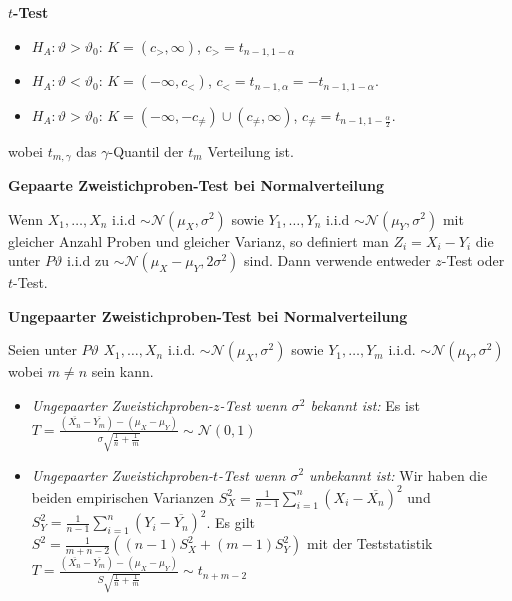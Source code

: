 \documentclass[25pt]{sciposter}
\newenvironment{method}[1]{\begin{mdframed}[backgroundcolor=blue!10,innertopmargin=15pt, innerbottommargin=15pt,nobreak=true]
		\textbf{#1 }
	}
	{ 
	\end{mdframed}
}
\begin{document}
\begin{multicols}{3}
\begin{method}{$t$-Test}
			\begin{itemize}
				\item $H_A: \vartheta > \vartheta_0$: $K = (c_>,\infty)$, $c_> = t_{n-1,1-\alpha}$
				\item $H_A: \vartheta < \vartheta_0$: $K = (-\infty,c_<)$, $c_< = t_{n-1,\alpha} = -t_{n-1,1-\alpha}$.
				\item $H_A: \vartheta > \vartheta_0$: $K = (-\infty,-c_{\neq}) \cup (c_{\neq},\infty)$, $c_{\neq} = t_{n-1,1-\frac{\alpha}{2}}$.
			\end{itemize}
			wobei $t_{m,\gamma}$ das $\gamma$-Quantil der $t_m$ Verteilung ist.
		\end{method}
		
		\begin{method}{Gepaarte Zweistichproben-Test bei Normalverteilung}
			Wenn $X_1,\ldots,X_n$ i.i.d $\sim \mathcal{N}(\mu_X,\sigma^2)$ sowie $Y_1,\ldots,Y_n$ i.i.d $\sim \mathcal{N}(\mu_Y,\sigma^2)$ mit gleicher Anzahl Proben und gleicher Varianz, so definiert man $Z_i = X_i-Y_i$ die unter $P\vartheta$ i.i.d zu $\sim \mathcal{N}(\mu_X-\mu_Y,2\sigma^2)$ sind. Dann verwende entweder $z$-Test oder $t$-Test.
		\end{method}
		
		
		\begin{method}{Ungepaarter Zweistichproben-Test bei Normalverteilung}
			Seien unter $P\vartheta$ $X_1,\ldots,X_n$ i.i.d. $\sim \mathcal{N}(\mu_X,\sigma^2)$ sowie $Y_1,\ldots,Y_m$ i.i.d. $\sim \mathcal{N}(\mu_Y,\sigma^2)$ wobei $m\neq n$ sein kann.
			\begin{itemize}
				\item \textit{Ungepaarter Zweistichproben-$z$-Test wenn $\sigma^2$ bekannt ist:} Es ist $T = \frac{(\overline{X_n} -\overline{Y_m}) - (\mu_X - \mu_Y)}{\sigma \sqrt{\frac{1}{n} + \frac{1}{m}}} \sim \mathcal{N}(0,1)$
				\item \textit{Ungepaarter Zweistichproben-$t$-Test wenn $\sigma^2$ unbekannt ist:} Wir haben die beiden empirischen Varianzen
				$S^2_X = \frac{1}{n-1} \sum_{i=1}^{n} (X_i - \overline{X_n})^2$ und $S^2_Y = \frac{1}{n-1} \sum_{i=1}^{n} (Y_i - \overline{Y_n})^2$. Es gilt $S^2 = \frac{1}{m+n-2}\left(\left(n-1\right)S_X^2 + \left(m-1\right)S_Y^2\right)$ mit der Teststatistik $T = \frac{(\overline{X_n} -\overline{Y_m}) - (\mu_X - \mu_Y)}{S \sqrt{\frac{1}{n} + \frac{1}{m}}} \sim t_{n+m-2}$
			\end{itemize}
			
		\end{method}
		

\end{multicols}
\end{document}
